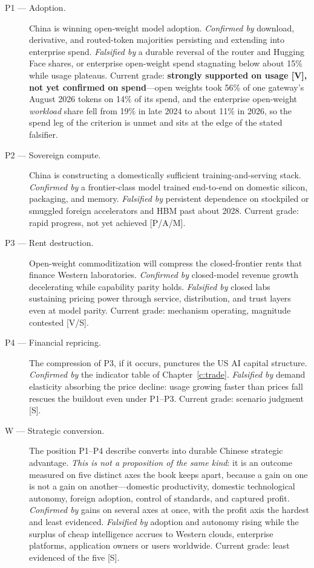 \begin{description}
  \item[P1 --- Adoption.] China is winning open-weight model adoption. \emph{Confirmed by} download, derivative, and routed-token majorities persisting and extending into enterprise spend. \emph{Falsified by} a durable reversal of the router and Hugging Face shares, or enterprise open-weight spend stagnating below about 15\% while usage plateaus. Current grade: \textbf{strongly supported on usage [V], not yet confirmed on spend}---open weights took 56\% of one gateway's August 2026 tokens on 14\% of its spend, and the enterprise open-weight \emph{workload} share fell from 19\% in late 2024 to about 11\% in 2026, so the spend leg of the criterion is unmet and sits at the edge of the stated falsifier.
  \item[P2 --- Sovereign compute.] China is constructing a domestically sufficient training-and-serving stack. \emph{Confirmed by} a frontier-class model trained end-to-end on domestic silicon, packaging, and memory. \emph{Falsified by} persistent dependence on stockpiled or smuggled foreign accelerators and HBM past about 2028. Current grade: rapid progress, not yet achieved [P/A/M].
  \item[P3 --- Rent destruction.] Open-weight commoditization will compress the closed-frontier rents that finance Western laboratories. \emph{Confirmed by} closed-model revenue growth decelerating while capability parity holds. \emph{Falsified by} closed labs sustaining pricing power through service, distribution, and trust layers even at model parity. Current grade: mechanism operating, magnitude contested [V/S].
  \item[P4 --- Financial repricing.] The compression of P3, if it occurs, punctures the US AI capital structure. \emph{Confirmed by} the indicator table of Chapter~\ref{c:trade}. \emph{Falsified by} demand elasticity absorbing the price decline: usage growing faster than prices fall rescues the buildout even under P1--P3. Current grade: scenario judgment [S].
  \item[W --- Strategic conversion.] The position P1--P4 describe converts into durable Chinese strategic advantage. \emph{This is not a proposition of the same kind}: it is an outcome measured on five distinct axes the book keeps apart, because a gain on one is not a gain on another---domestic productivity, domestic technological autonomy, foreign adoption, control of standards, and captured profit. \emph{Confirmed by} gains on several axes at once, with the profit axis the hardest and least evidenced. \emph{Falsified by} adoption and autonomy rising while the surplus of cheap intelligence accrues to Western clouds, enterprise platforms, application owners or users worldwide. Current grade: least evidenced of the five [S].
\end{description}

